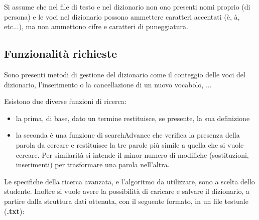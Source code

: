 \documentclass[paper=a4, fontsize=11pt,twoside]{scrartcl}   %
\begin{document}
		Si assume che nel file di testo e nel dizionario non ono presenti nomi proprio (di persona) e le voci nel dizionario possono ammettere caratteri accentati (è, à, etc...), ma non ammettono cifre e caratteri di puneggiatura.
		
	\subsection{Funzionalità richieste}
		Sono presenti metodi di gestione del dizionario come il conteggio delle voci del dizionario, l'inserimento o la cancellazione di un nuovo vocabolo, ...
		
		Esistono due diverse funzioni di ricerca:
		\begin{itemize}
			\item la prima, di base, dato un termine restituisce, se presente, la sua definizione
			\item la seconda è una funzione di searchAdvance che verifica la presenza della parola da cercare e restituisce la tre parole più simile a quella che si vuole cercare. Per similarità si intende il minor numero di modifiche (sostituzioni, inserimenti) per trasformare una parola nell'altra.
		\end{itemize}			
		 Le specifiche della ricerca avanzata, e l'algoritmo da utilizzare, sono a scelta dello studente. Inoltre si vuole avere la possibilità di caricare e salvare il dizionario, a partire dalla struttura dati ottenuta, con il seguente formato, in un file testuale (\textbf{.txt}):
		 
\end{document}
